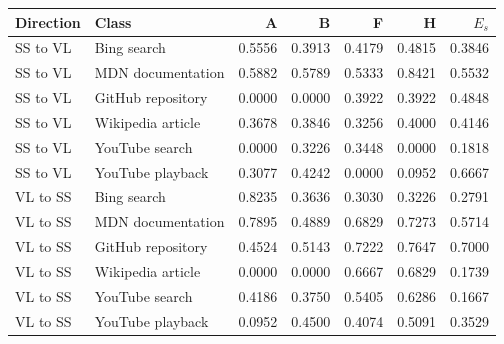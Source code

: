 \begin{tabular}{llrrrrr}
\toprule
Direction & Class & A & B & F & H & $E_s$ \\
\midrule
SS to VL & Bing search & 0.5556 & 0.3913 & 0.4179 & 0.4815 & 0.3846 \\
SS to VL & MDN documentation & 0.5882 & 0.5789 & 0.5333 & 0.8421 & 0.5532 \\
SS to VL & GitHub repository & 0.0000 & 0.0000 & 0.3922 & 0.3922 & 0.4848 \\
SS to VL & Wikipedia article & 0.3678 & 0.3846 & 0.3256 & 0.4000 & 0.4146 \\
SS to VL & YouTube search & 0.0000 & 0.3226 & 0.3448 & 0.0000 & 0.1818 \\
SS to VL & YouTube playback & 0.3077 & 0.4242 & 0.0000 & 0.0952 & 0.6667 \\
VL to SS & Bing search & 0.8235 & 0.3636 & 0.3030 & 0.3226 & 0.2791 \\
VL to SS & MDN documentation & 0.7895 & 0.4889 & 0.6829 & 0.7273 & 0.5714 \\
VL to SS & GitHub repository & 0.4524 & 0.5143 & 0.7222 & 0.7647 & 0.7000 \\
VL to SS & Wikipedia article & 0.0000 & 0.0000 & 0.6667 & 0.6829 & 0.1739 \\
VL to SS & YouTube search & 0.4186 & 0.3750 & 0.5405 & 0.6286 & 0.1667 \\
VL to SS & YouTube playback & 0.0952 & 0.4500 & 0.4074 & 0.5091 & 0.3529 \\
\bottomrule
\end{tabular}
